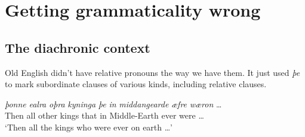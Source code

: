\chapter{Getting grammaticality wrong}

%
%
%

\section{The diachronic context}


Old English didn't have relative pronouns the way we have them. It just used \textit{þe} to mark subordinate clauses of various kinds, including relative clauses.

\ea \label{ex:kyninga}
    \gll \textit{þonne} \textit{ealra} \textit{oþra} \textit{kyninga} \textit{þe} \textit{in} \textit{middangearde} \textit{æfre} \textit{wæron} \dots\\
        Then all other kings that in Middle-Earth ever were \dots\\
    \glt `Then all the kings who were ever on earth \dots'
\z

